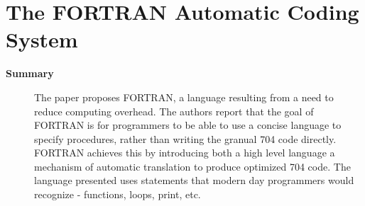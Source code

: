 \section {The FORTRAN Automatic Coding System \cite{backus1957fortran}}

\begin{description}
    \item[\textbf{Summary}]
    The paper proposes FORTRAN, a language resulting from a need to reduce 
    computing overhead. The authors report that the goal of FORTRAN is for
    programmers to be able to use a concise language to specify procedures,
    rather than writing the granual 704 code directly. FORTRAN achieves this by
    introducing both a high level language a mechanism of automatic translation
    to produce optimized 704 code. The language presented uses statements that
    modern day programmers would recognize - functions, loops, print, etc.


\end{description}

